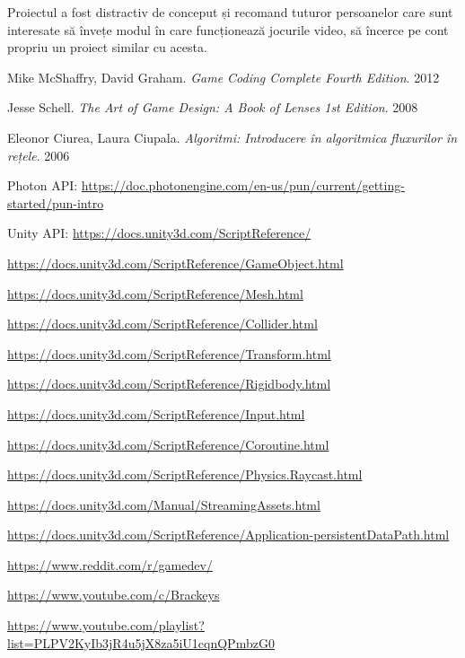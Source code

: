 \documentclass[12pt, a4paper]{article}
\begin{document}
	Proiectul a fost distractiv de conceput și recomand tuturor persoanelor care sunt interesate să învețe modul în care funcționează jocurile video, să încerce pe cont propriu un proiect similar cu acesta.
	
	
	
	\pagebreak
	
	\begin{thebibliography}{18}
		
		Mike McShaffry, David Graham. \newline
		\textit{Game Coding Complete Fourth Edition}. 2012
		
		Jesse Schell.  \newline
		\textit{The Art of Game Design: A Book of Lenses 1st Edition}. 2008
		
		Eleonor Ciurea, Laura Ciupala.  \newline
		\textit{Algoritmi: Introducere în algoritmica fluxurilor în rețele}. 2006
		
		Photon API: \url{https://doc.photonengine.com/en-us/pun/current/getting-started/pun-intro}
		
		Unity API: \url{https://docs.unity3d.com/ScriptReference/}
		
		\url{https://docs.unity3d.com/ScriptReference/GameObject.html}
		
		\url{https://docs.unity3d.com/ScriptReference/Mesh.html}
		
		\url{https://docs.unity3d.com/ScriptReference/Collider.html}
		
		\url{https://docs.unity3d.com/ScriptReference/Transform.html}
		
		\url{https://docs.unity3d.com/ScriptReference/Rigidbody.html}
		
		\url{https://docs.unity3d.com/ScriptReference/Input.html}
		
		\url{https://docs.unity3d.com/ScriptReference/Coroutine.html}
		
		\url{https://docs.unity3d.com/ScriptReference/Physics.Raycast.html}
		
		\url{https://docs.unity3d.com/Manual/StreamingAssets.html}
		
		\url{https://docs.unity3d.com/ScriptReference/Application-persistentDataPath.html}
		
		\url{https://www.reddit.com/r/gamedev/}
		
		\url{https://www.youtube.com/c/Brackeys}
		
		\url{https://www.youtube.com/playlist?list=PLPV2KyIb3jR4u5jX8za5iU1cqnQPmbzG0}
		
	\end{thebibliography}
	
	
\end{document}
